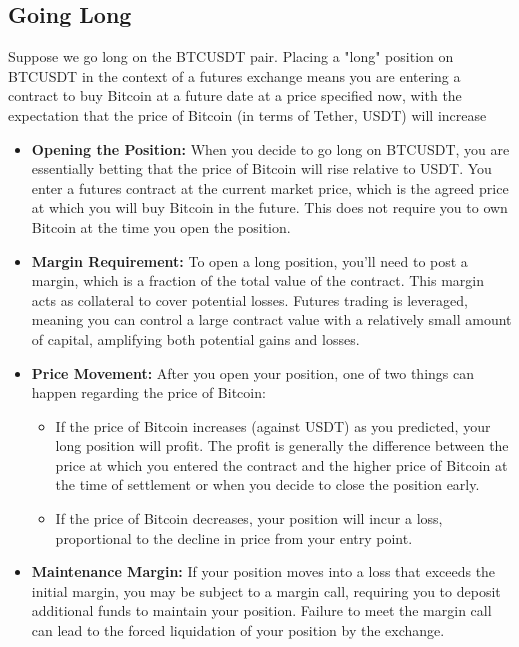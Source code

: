 \documentclass{report}
\begin{document}
    \subsection{Going Long}
    Suppose we go long on the BTCUSDT pair. Placing a "long" position on BTCUSDT in the context of a futures exchange means you are entering a contract to buy Bitcoin at a future date at a price specified now, with the expectation that the price of Bitcoin (in terms of Tether, USDT) will increase
    \bigbreak \noindent 
    \begin{itemize}
        \item \textbf{Opening the Position:} When you decide to go long on BTCUSDT, you are essentially betting that the price of Bitcoin will rise relative to USDT. You enter a futures contract at the current market price, which is the agreed price at which you will buy Bitcoin in the future. This does not require you to own Bitcoin at the time you open the position.
        \item \textbf{Margin Requirement:} To open a long position, you'll need to post a margin, which is a fraction of the total value of the contract. This margin acts as collateral to cover potential losses. Futures trading is leveraged, meaning you can control a large contract value with a relatively small amount of capital, amplifying both potential gains and losses.
        \item \textbf{Price Movement:} After you open your position, one of two things can happen regarding the price of Bitcoin:
            \begin{itemize}
                \item If the price of Bitcoin increases (against USDT) as you predicted, your long position will profit. The profit is generally the difference between the price at which you entered the contract and the higher price of Bitcoin at the time of settlement or when you decide to close the position early.
                \item If the price of Bitcoin decreases, your position will incur a loss, proportional to the decline in price from your entry point.
            \end{itemize}
        \item \textbf{Maintenance Margin:} If your position moves into a loss that exceeds the initial margin, you may be subject to a margin call, requiring you to deposit additional funds to maintain your position. Failure to meet the margin call can lead to the forced liquidation of your position by the exchange.

\end{itemize}
\end{document}
